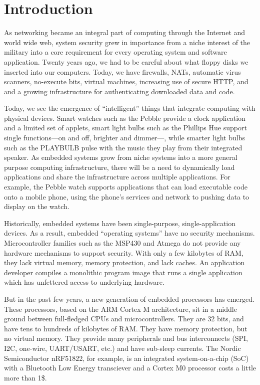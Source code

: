 \section{Introduction}

As networking became an integral part of computing through the Internet and
world wide web, system security grew in importance from a niche interest
of the military into a core requirement for every operating system and 
software application. Twenty years ago, we had to be careful about what
floppy disks we inserted into our computers. Today, we have firewalls,
NATs, automatic virus scanners, no-execute bits, virtual machines, 
increasing use of secure HTTP, and and a growing infrastructure for 
authenticating downloaded data and code.

Today, we see the emergence of ``intelligent'' things that integrate
computing with physical devices. Smart watches such as the Pebble
provide a clock application and a limited set of applets, smart light
bulbs such as the Phillips Hue support single functions---on and off,
brighter and dimmer---, while smarter light bulbs such as the PLAYBULB
pulse with the music they play from their integrated speaker. 
As embedded systems grow from niche systems into a more general purpose
computing infrastructure, there will be a need to dynamically load 
applications and share the infrastructure across multiple applications. 
For example, the Pebble watch supports applications that can load 
executable code onto a mobile phone, using the phone's services and
network to pushing data to display on the watch. 

Historically,
embedded systems have been single-purpose, single-application devices.
As a result, embedded ``operating systems'' have no security mechanisms.
Microcontroller families such as the MSP430 and Atmega do not provide
any hardware mechanisms to support security. With only a few kilobytes of RAM,
they lack virtual memory, memory protection, and lack caches. 
An application developer compiles a monolithic program image that runs 
a single application which has unfettered access to underlying hardware. 

But in the past few years, a new generation of embedded processors
has emerged. These processors, based on the ARM Cortex M architecture,
sit in a middle ground between full-fledged CPUs and microcontrollers.
They are 32 bits, and have tens to hundreds of kilobytes of RAM. They have
memory protection, but no virtual memory. They provide many peripherals
and bus interconnects (SPI, I2C, one-wire, UART/USART, etc.) and
have sub-\uA sleep currents. The Nordic Semiconductor nRF51822, for example,
is an integrated system-on-a-chip (SoC) with a Bluetooth Low Energy 
transciever and a Cortex M0 processor costs a little more than 1\$.

